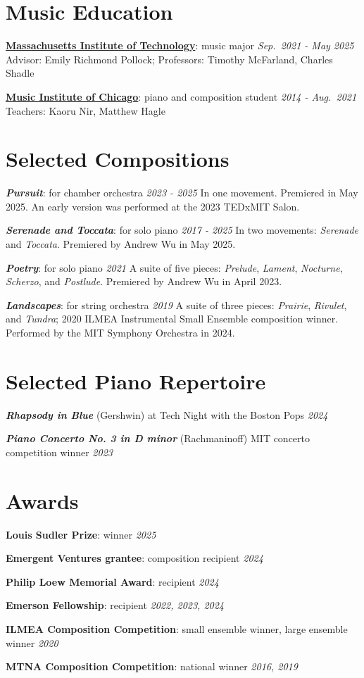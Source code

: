 \documentclass[12pt,a4paper,sans]{moderncv}
\newcommand{\entry}[4]{%
  \textbf{#1}: #2 \hfill \emph{#3}\newline
  {\small #4}}
\newcommand{\piecedesc}[4]{%
  \textbf{\emph{#1}} (#2) {\small #4} \hfill \emph{#3}\par
  \addvspace{10pt}}
\newcommand{\award}[3]{%
  \textbf{#1}: #2 \hfill \emph{#3}\par
  \addvspace{10pt}}
\begin{document}
\makecvtitle

\vspace{-30pt}

\section{Music Education}

\bigskip
\entry{\href{https://music.mit.edu/}{Massachusetts Institute of Technology}}{music major}{Sep.\ 2021 - May 2025}{Advisor: Emily Richmond Pollock; Professors: Timothy McFarland, Charles Shadle}

\bigskip
\entry{\href{https://www.musicinst.org/}{Music Institute of Chicago}}{piano and composition student}{2014 - Aug.\ 2021}{Teachers: Kaoru Nir, Matthew Hagle}

\section{Selected Compositions}

\bigskip
\entry{\emph{Pursuit}}{for chamber orchestra}{2023 - 2025}{In one movement. Premiered in May 2025. An early version was performed at the 2023 TEDxMIT Salon.}

\bigskip
\entry{\emph{Serenade and Toccata}}{for solo piano}{2017 - 2025}{In two movements: \emph{Serenade} and \emph{Toccata}. Premiered by Andrew Wu in May 2025.}

\bigskip
\entry{\emph{Poetry}}{for solo piano}{2021}{A suite of five pieces: \emph{Prelude}, \emph{Lament}, \emph{Nocturne}, \emph{Scherzo}, and \emph{Postlude}. Premiered by Andrew Wu in April 2023.}

\bigskip
\entry{\emph{Landscapes}}{for string orchestra}{2019}{A suite of three pieces: \emph{Prairie}, \emph{Rivulet}, and \emph{Tundra}; 2020 ILMEA Instrumental Small Ensemble composition winner. Performed by the MIT Symphony Orchestra in 2024.}

\section{Selected Piano Repertoire}

\piecedesc{Rhapsody in Blue}{Gershwin}{2024}{at Tech Night with the Boston Pops}
\piecedesc{Piano Concerto No. 3 in D minor}{Rachmaninoff}{2023}{MIT concerto competition winner}

\section{Awards}
\award{Louis Sudler Prize}{winner}{2025}
\award{Emergent Ventures grantee}{composition recipient}{2024}
\award{Philip Loew Memorial Award}{recipient}{2024}
\award{Emerson Fellowship}{recipient}{2022, 2023, 2024}
\award{ILMEA Composition Competition}{small ensemble winner, large ensemble winner}{2020}
\award{MTNA Composition Competition}{national winner}{2016, 2019}
\end{document}
